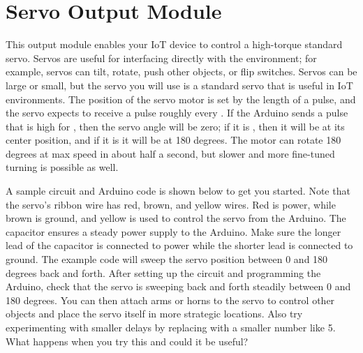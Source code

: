 
\clearpage
\section{Servo Output Module}
\label{sec-output-servo}

This output module enables your IoT device to control a high-torque
standard servo. Servos are useful for interfacing directly with the
environment; for example, servos can tilt, rotate, push other objects,
or flip switches. Servos can be large or small, but the servo you will
use is a standard servo that is useful in IoT environments. The position
of the servo motor is set by the length of a pulse, and the servo
expects to receive a pulse roughly every . If the Arduino
sends a pulse that is high for , then the servo angle will be
zero; if it is , then it will be at its center position, and
if it is  it will be at 180 degrees. The motor can rotate 180
degrees at max speed in about half a second, but slower and more
fine-tuned turning is possible as well.

A sample circuit and Arduino code is shown below to get you started.
Note that the servo's ribbon wire has red, brown, and yellow wires. Red
is power, while brown is ground, and yellow is used to control the servo
from the Arduino. The  capacitor ensures a steady power
supply to the Arduino. Make sure the longer lead of the capacitor is
connected to power while the shorter lead is connected to ground.  The
example code will sweep the servo position between 0 and 180 degrees
back and forth. After setting up the circuit and programming the
Arduino, check that the servo is sweeping back and forth steadily
between 0 and 180 degrees. You can then attach arms or horns to the
servo to control other objects and place the servo itself in more
strategic locations. Also try experimenting with smaller delays by
replacing  with a smaller number like 5. What happens when
you try this and could it be useful?

